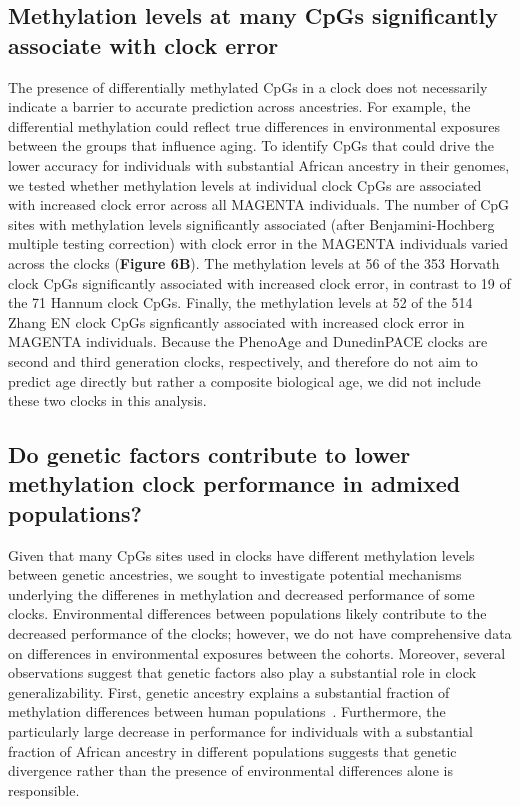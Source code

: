 \subsection{Methylation levels at many CpGs significantly associate with clock error}
The presence of differentially methylated CpGs in a clock does not necessarily indicate a barrier to accurate prediction across ancestries. For example, the differential methylation could reflect true differences in environmental exposures between the groups that influence aging. To identify CpGs that could drive the lower accuracy for individuals with substantial African ancestry in their genomes, we tested whether methylation levels at individual clock CpGs are associated with increased clock error across all MAGENTA individuals. The number of CpG sites with methylation levels significantly associated (after Benjamini-Hochberg multiple testing correction) with clock error in the MAGENTA individuals varied across the clocks (\textbf{Figure 6B}). The methylation levels at 56 of the 353 Horvath clock CpGs significantly associated with increased clock error, in contrast to 19 of the 71 Hannum clock CpGs. Finally, the methylation levels at 52 of the 514 Zhang EN clock CpGs signficantly associated with increased clock error in MAGENTA individuals. Because the PhenoAge and DunedinPACE clocks are second and third generation clocks, respectively, and therefore do not aim to predict age directly but rather a composite biological age, we did not include these two clocks in this analysis. 

\subsection{Do genetic factors contribute to lower methylation clock performance in admixed populations?}

Given that many CpGs sites used in clocks have different methylation levels between genetic ancestries, we sought to investigate potential mechanisms underlying the differenes in methylation and decreased performance of some clocks. Environmental differences between populations likely contribute to the decreased performance of the clocks; however, we do not have comprehensive data on differences in environmental exposures between the cohorts. Moreover, several observations suggest that genetic factors also play a substantial role in clock generalizability. First, genetic ancestry explains a substantial fraction of methylation differences between human populations~\citep{galanter_differential_2017}. Furthermore, the particularly large decrease in performance for individuals with a substantial fraction of African ancestry in different populations suggests that genetic divergence rather than the presence of environmental differences alone is responsible. 

